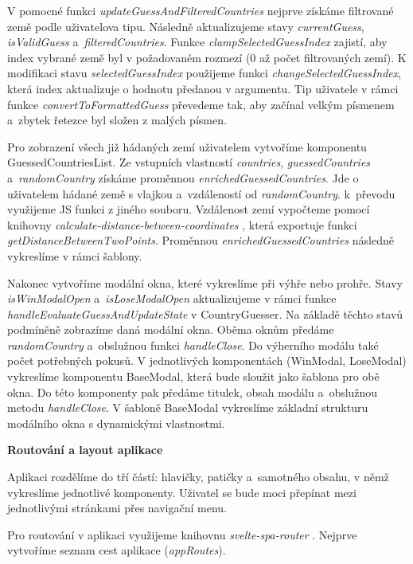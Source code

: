 V pomocné funkci \emph{updateGuessAndFilteredCountries} nejprve získáme filtrované země podle uživatelova tipu. Následně aktualizujeme stavy \emph{currentGuess}, \emph{isValidGuess} a~\emph{filteredCountries}. 
Funkce \emph{clampSelectedGuessIndex} zajistí, aby index vybrané země byl v požadovaném rozmezí (0 až počet filtrovaných zemí). 
K modifikaci stavu \emph{selectedGuessIndex} použijeme funkci \emph{changeSelectedGuessIndex}, která index aktualizuje o hodnotu předanou v argumentu. 
Tip uživatele v rámci funkce \emph{convertToFormattedGuess} převedeme tak, aby začínal velkým písmenem a~zbytek řetezce byl složen z malých písmen.

Pro zobrazení všech již hádaných zemí uživatelem vytvoříme komponentu GuessedCountriesList. 
Ze vstupních vlastností \emph{countries}, \emph{guessedCountries} a~\emph{randomCountry} získáme proměnnou \emph{enrichedGuessedCountries}. 
Jde o uživatelem hádané země s vlajkou a~vzdáleností od \emph{randomCountry}. k~převodu využijeme JS funkci z jiného souboru. 
Vzdálenost zemí vypočteme pomocí knihovny \emph{calculate-distance-between-coordinates} \cite{distancebetweencoordinates}, která exportuje funkci \emph{getDistanceBetweenTwoPoints}. 
Proměnnou \emph{enrichedGuessedCountries} následně vykreslíme v rámci šablony.

Nakonec vytvoříme modální okna, které vykreslíme při výhře nebo prohře. Stavy \emph{isWinModalOpen} a~\emph{isLoseModalOpen} aktualizujeme v rámci funkce \emph{handleEvaluateGuessAndUpdateState} v CountryGuesser. 
Na základě těchto stavů podmíněně zobrazíme daná modální okna. Oběma oknům předáme \emph{randomCountry} a~obslužnou funkci \emph{handleClose}. Do výherního modálu také počet potřebných pokusů. 
V jednotlivých komponentách (WinModal, LoseModal) vykreslíme komponentu BaseModal, která bude sloužit jako šablona pro obě okna. Do této komponenty pak předáme titulek, obsah modálu a~obslužnou metodu \emph{handleClose}. 
V šabloně BaseModal vykreslíme základní strukturu modálního okna s dynamickými vlastnostmi.

\begin{flushleft}
  \textbf{Routování a layout aplikace}
\end{flushleft}

Aplikaci rozdělíme do tří částí: hlavičky, patičky a~samotného obsahu, v němž vykreslíme jednotlivé komponenty. Uživatel se bude moci přepínat mezi jednotlivými stránkami přes navigační menu. 

Pro routování v aplikaci využijeme knihovnu \emph{svelte-spa-router} \cite{sveltesparouterlib}. Nejprve vytvoříme seznam cest aplikace (\emph{appRoutes}).

